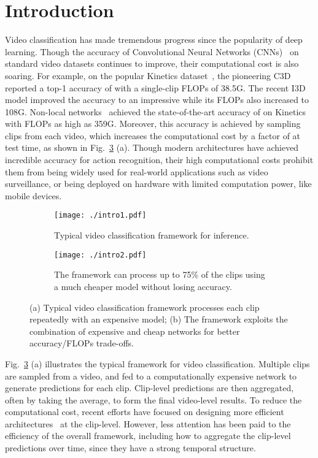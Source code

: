 \documentclass[10pt,twocolumn,letterpaper]{article}
\begin{document}
\section{Introduction}

Video classification has made tremendous progress since the popularity of deep learning. Though the accuracy of Convolutional Neural Networks (CNNs)~\cite{lecun1998gradient}
on standard video datasets continues to improve, their computational cost is also soaring. For example, on the popular Kinetics dataset~\cite{kay2017kinetics}, the pioneering C3D~\cite{c3d} reported a top-1 accuracy of  with a single-clip FLOPs of 38.5G. The recent I3D~\cite{carreira2017quo} model improved the accuracy to an impressive  while its FLOPs also increased to 108G. Non-local networks~\cite{wang2018non} achieved the state-of-the-art accuracy of  on Kinetics with FLOPs as high as 359G. Moreover, this accuracy is achieved by sampling  clips from each video, which increases the computational cost by a factor of  at test time, as shown in Fig.~\ref{fig:intro} (a). Though modern architectures have achieved incredible accuracy for action recognition, their high computational costs prohibit them from being widely used for real-world applications such as video surveillance, or being deployed on hardware with limited computation power, like mobile devices.

\begin{figure}[t]
\centering
\begin{subfigure}[b]{.9\textwidth}
    \centering
    \texttt{[image: ./intro1.pdf]}
    \caption{Typical video classification framework for inference.}
    \label{fig:Ng1}
\end{subfigure}
\begin{subfigure}[b]{0.9\textwidth}
    \centering
    \texttt{[image: ./intro2.pdf]}
    \caption{The \oursfr framework can process up to 75\% of the clips using a much cheaper model without losing accuracy.} 
    \label{fig:Ng2}
\end{subfigure}
\caption{(a) Typical video classification framework processes each clip repeatedly with an expensive model; (b) The \oursfr framework exploits the combination of expensive and cheap networks for better accuracy/FLOPs trade-offs.
}
\label{fig:intro}
\end{figure}


Fig.~\ref{fig:intro} (a) illustrates the typical framework for video classification. Multiple clips are sampled from a video, and  fed to a computationally expensive network to generate predictions for each clip. Clip-level predictions are then aggregated, often by taking the average, to form the final video-level results. To reduce the computational cost, recent efforts have focused on designing more efficient architectures~\cite{howard2017mobilenets} at the clip-level. However, less attention has been paid to the efficiency of the overall framework, including how to aggregate the clip-level predictions over time, since they have a strong temporal structure. 
\end{document}
